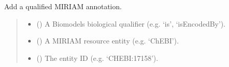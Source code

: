 \documentclass[letterpaper,12pt,english]{sphinxmanual}
\begin{document}
\begin{fulllineitems}
\begin{fulllineitems}
\label{\detokenize{api/core:cbmpy.CBCommon.MIRIAMannotation.addMIRIAMannotation}}
\pysigstartsignatures
\pysiglinewithargsret
{}
{\sphinxparamcomma {}\sphinxparamcomma {}}
{}
\pysigstopsignatures
\sphinxAtStartPar
Add a qualified MIRIAM annotation.
\begin{quote}\begin{description}
\begin{itemize}
\item {} 
\sphinxAtStartPar
{} () \textendash{} A Biomodels biological qualifier (e.g. ‘is’, ‘isEncodedBy’).

\item {} 
\sphinxAtStartPar
{} () \textendash{} A MIRIAM resource entity (e.g. ‘ChEBI’).

\item {} 
\sphinxAtStartPar
{} () \textendash{} The entity ID (e.g. ‘CHEBI:17158’).

\end{itemize}

\sphinxAtStartPar
{}

\end{description}\end{quote}

\end{fulllineitems}



\end{fulllineitems}
\end{document}
